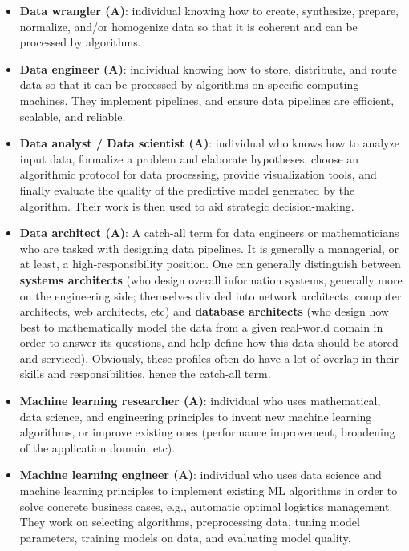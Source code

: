 \documentclass{article}
\begin{document}
\begin{itemize}

	\item \textbf{Data wrangler (A)}: individual knowing how to create, synthesize, prepare, normalize, and/or homogenize data so that it is coherent and can be processed by algorithms.

	\item \textbf{Data engineer (A)}: individual knowing how to store, distribute, and route data so that it can be processed by algorithms on specific computing machines. They implement pipelines, and ensure data pipelines are efficient, scalable, and reliable.

	\item \textbf{Data analyst / Data scientist (A)}: individual who knows how to analyze input data, formalize a problem and elaborate hypotheses, choose an algorithmic protocol for data processing, provide visualization tools, and finally evaluate the quality of the predictive model generated by the algorithm. Their work is then used to aid strategic decision-making.

	\item \textbf{Data architect (A)}: A catch-all term for data engineers or mathematicians who are tasked with designing data pipelines. It is generally a managerial, or at least, a high-responsibility position. One can generally distinguish between \textbf{systems architects} (who design overall information systems, generally more on the engineering side; themselves divided into network architects, computer architects, web architects, etc) and \textbf{database architects} (who design how best to mathematically model the data from a given real-world domain in order to answer its questions, and help define how this data should be stored and serviced). Obviously, these profiles often do have a lot of overlap in their skills and responsibilities, hence the catch-all term.

	\item \textbf{Machine learning researcher (A)}: individual who uses mathematical, data science, and engineering principles to invent new machine learning algorithms, or improve existing ones (performance improvement, broadening of the application domain, etc).

	\item \textbf{Machine learning engineer (A)}: individual who uses data science and machine learning principles to implement existing ML algorithms in order to solve concrete business cases, e.g., automatic optimal logistics management. They work on selecting algorithms, preprocessing data, tuning model parameters, training models on data, and evaluating model quality.


\end{itemize}
\end{document}
